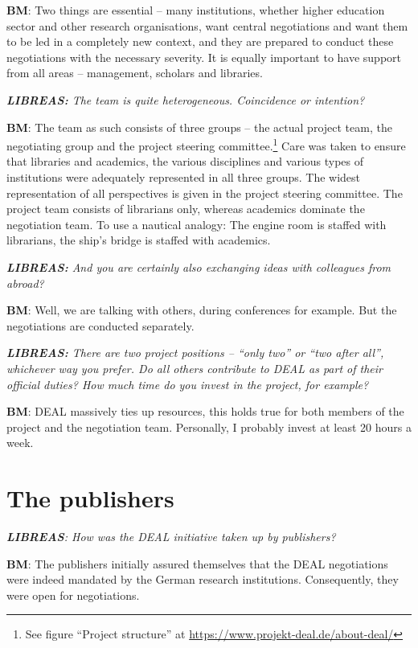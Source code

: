 \documentclass[a4paper,
fontsize=11pt,
oneside,
numbers=noperiodatend,
parskip=half-,
bibliography=totoc,
final
]{scrartcl}
\begin{document}
\textbf{BM}: Two things are essential -- many institutions, whether
higher education sector and other research organisations, want central
negotiations and want them to be led in a completely new context, and
they are prepared to conduct these negotiations with the necessary
severity. It is equally important to have support from all areas --
management, scholars and libraries.

\emph{\textbf{LIBREAS:} The team is quite heterogeneous. Coincidence or
intention?}

\textbf{BM}: The team as such consists of three groups -- the actual
project team, the negotiating group and the project steering
committee.\footnote{See figure \enquote{Project structure} at
  \url{https://www.projekt-deal.de/about-deal/}} Care was taken to
ensure that libraries and academics, the various disciplines and various
types of institutions were adequately represented in all three groups.
The widest representation of all perspectives is given in the project
steering committee. The project team consists of librarians only,
whereas academics dominate the negotiation team. To use a nautical
analogy: The engine room is staffed with librarians, the ship's bridge
is staffed with academics.

\emph{\textbf{LIBREAS:} And you are certainly also exchanging ideas with
colleagues from abroad?}

\textbf{BM}: Well, we are talking with others, during conferences for
example. But the negotiations are conducted separately.

\emph{\textbf{LIBREAS:} There are two project positions -- \enquote{only
two} or \enquote{two after all}, whichever way you prefer. Do all others
contribute to DEAL as part of their official duties? How much time do
you invest in the project, for example?}

\textbf{BM}: DEAL massively ties up resources, this holds true for both
members of the project and the negotiation team. Personally, I probably
invest at least 20 hours a week.

\hypertarget{the-publishers}{%
\section*{The publishers}\label{the-publishers}}

\emph{\textbf{LIBREAS}: How was the DEAL initiative taken up by
publishers?}

\textbf{BM}: The publishers initially assured themselves that the DEAL
negotiations were indeed mandated by the German research institutions.
Consequently, they were open for negotiations.
\end{document}
